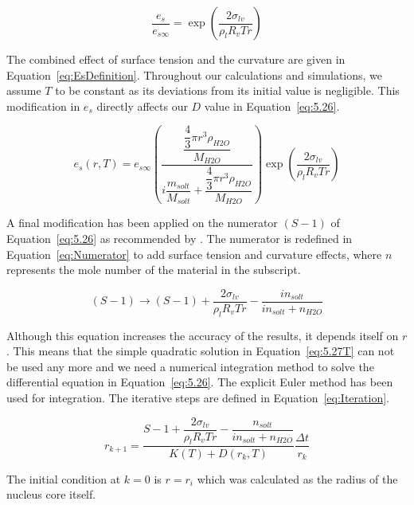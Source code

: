 \documentclass[]{article}
\begin{document}
\begin{equation}
    \label{eq:Curvature}
    \dfrac{e_{s}}{e_{s\infty}}=\exp \left( \dfrac{2\sigma_{lv}}{\rho_{l}R_{v}Tr} \right)
\end{equation}

The combined effect of surface tension and the curvature are given in
Equation~\eqref{eq:EsDefinition}. Throughout our calculations and simulations, we assume $T$ to be constant as its deviations from its initial value is negligible. This modification in $e_{s}$ directly affects our $D$ value in Equation~\eqref{eq:5.26}.

\begin{equation}
    \label{eq:EsDefinition}
    e_{s}(r,T)=e_{s\infty}\left(\dfrac{\dfrac{\dfrac{4}{3}\pi r^{3} \rho_{H2O}}{M_{H2O}}}{i \dfrac{m_{solt}}{M_{solt}} + \dfrac{\dfrac{4}{3}\pi r^{3} \rho_{H2O}}{M_{H2O}}}\right) \exp \left( \dfrac{2\sigma_{lv}}{\rho_{l}R_{v}Tr} \right)
\end{equation}

A final modification has been applied on the numerator $(S-1)$ of Equation~\eqref{eq:5.26} as recommended
by \cite{Mason}. The numerator is redefined in Equation~\eqref{eq:Numerator} to
add surface tension and curvature effects, where $n$ represents the mole number of the material in the subscript.

\begin{equation}
    \label{eq:Numerator}
    (S-1) \rightarrow (S-1)+\dfrac{2\sigma_{lv}}{\rho_{l}R_{v}Tr}-\dfrac{i n_{solt}}{i n_{solt}+n_{H2O}}
\end{equation}

Although this equation increases the accuracy of the results, it depends itself
on $r$. This means that the simple quadratic solution in Equation~\eqref{eq:5.27T} can not be used any more
and we need a numerical integration method to solve the differential equation in Equation~\eqref{eq:5.26}. The explicit
Euler method has been used for integration. The iterative steps are defined in
Equation~\eqref{eq:Iteration}.

\begin{equation}
    \label{eq:Iteration}
    r_{k+1}= \dfrac{S - 1+\dfrac{2\sigma_{lv}}{\rho_{l}R_{v}Tr}-\dfrac{n_{solt}}{i n_{solt}+n_{H2O}}}{K(T) + D(r_{k},T)}\dfrac{\Delta t}{r_{k}}
\end{equation}

The initial condition at $k=0$ is $r=r_{i}$ which was calculated as the radius
of the nucleus core itself.
\end{document}

